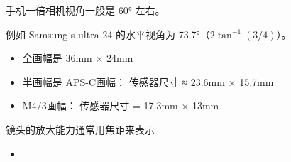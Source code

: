 
手机一倍相机视角一般是 60° 左右。

例如 Samsung s ultra 24 的水平视角为 73.7°（$2\tan^{-1}(3/4)$）。

\begin{itemize}
\item 全画幅是 36mm × 24mm
\item 半画幅是 APS-C画幅： 传感器尺寸 ≈ 23.6mm × 15.7mm
\item M4/3画幅： 传感器尺寸 = 17.3mm × 13mm
\end{itemize}

镜头的放大能力通常用焦距来表示
\begin{itemize}
\item 
\end{itemize}
